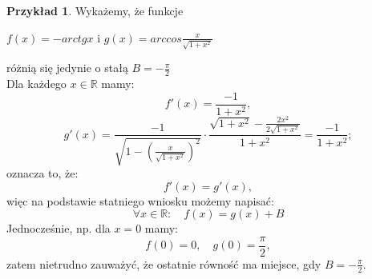 \documentclass[a4paper,12pt]{article}
\theoremstyle{definition}
\newtheorem{ex}{Przykład}
\begin{document}
\begin{ex}
Wykażemy, że funkcje
\end{ex}
\begin{center}
$ f(x) = -arctgx$ \quad i \quad $g(x) = arccos\frac{x}{\sqrt{1 + x^{2}}}$
\end{center}
różnią się jedynie o stałą $B = -\frac{\pi}{2}$\\

Dla każdego $x \in \mathbb{R}$ mamy: 
$$f'(x) = \frac{-1}{1 + x^2}, $$
$$g'(x) = \frac{-1}{\sqrt{1-{(\frac{x}{\sqrt{1 + x^{2}}})}^{2}}} \cdot \frac{\sqrt{1 + x^{2}} -  \frac{2x^{2}}{2\sqrt{1 + x^{2}}}}{1 + x^{2}} = \frac{-1}{1 + x^{2}}; $$
oznacza to, że: 
$$f'(x) = g'(x),$$
więc na podstawie statniego wniosku możemy napisać:
$$\forall x \in \mathbb{R}:\quad f(x) = g(x) + B$$
Jednocześnie, np. dla $x = 0$ mamy: 
$$ f(0) = 0, \quad g(0)=\frac{\pi}{2},$$
zatem nietrudno zauważyć, że ostatnie równość ma miejsce, gdy $B = -\frac{\pi}{2}$. 
\end{document}
